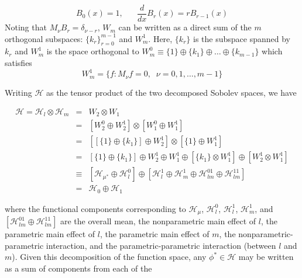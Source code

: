 \documentclass[12pt]{article}
\theoremstyle{definition}
\begin{document}
\[
B_0\left(x\right) = 1,\;\;\;\;\;\; \frac{d}{dx} B_r\left(x\right) = rB_{r-1}\left(x\right)
\]
\noindent
Noting that $M_\nu B_r = \delta_{\nu-r}$, $W_m$ can be written as a direct sum of the $m$ orthogonal subspaces: $\lbrace k_r \rbrace_{r=0}^{m-1}$ and $W_m^1$.   Here, $\lbrace k_r \rbrace$ is the subspace spanned by $k_r$ and $W_m^1$ is the space orthogonal to $W_m^0 \equiv \lbrace 1 \rbrace \oplus \lbrace k_1 \rbrace \oplus \dots \oplus \lbrace k_{m-1} \rbrace$ which satisfies 
\[
W_m^1 = \lbrace f: M_\nu f = 0,\;\; \nu = 0,1,\dots, m-1\rbrace
\]

\noindent
Writing $\mathcal{H}$ as the tensor product of the two decomposed Sobolev spaces, we have

\begin{eqnarray}
\mathcal{H} = \mathcal{H}_l  \otimes \mathcal{H}_m &=& W_2 \otimes W_1 \label{eq:HilbertDecomp} \\ 
&=& \left[ W_2^0 \oplus W_2^1 \right] \otimes \left[ W_1^0 \oplus W_1^1 \right] \nonumber \\ 
&=& \left[ \left[ \lbrace 1 \rbrace \oplus \lbrace k_1 \rbrace \right] \oplus W_2^1 \right] \otimes \left[ \lbrace 1 \rbrace \oplus W_1^1 \right] \nonumber \\ 
&=&\left[ \lbrace 1 \rbrace  \oplus \lbrace k_1 \rbrace \right] \oplus W_2^1 \oplus W_1^1 \oplus  \left[ \lbrace k_1 \rbrace  \otimes  W_1^1 \right]  \oplus  \left[W_2^1 \otimes  W_1^1   \right] \nonumber \\
&\equiv& \left[ \mathcal{H}_{\mu^*} \oplus \mathcal{H}_l^0 \right] \oplus \left[ \mathcal{H}_l^1 \oplus \mathcal{H}_m^1 \oplus \mathcal{H}_{lm}^{01} \oplus \mathcal{H}_{lm}^{11}\right]
\nonumber\\
&=& \mathcal{H}_0 \oplus \mathcal{H}_1
\nonumber
\end{eqnarray} 

\noindent
where the functional components corresponding to $\mathcal{H}_\mu$, $\mathcal{H}_l^0$, $\mathcal{H}_l^1$, $\mathcal{H}_m^1$, and $\left[ \mathcal{H}_{lm}^{01} \oplus \mathcal{H}_{lm}^{11}\right]$ are the overall mean, the nonparametric main effect of $l$, the parametric main effect of $l$, the parametric main effect of $m$, the nonparametric-parametric interaction, and the parametric-parametric interaction (between $l$ and $m$). Given this decomposition of the function space, any $\phi^* \in \mathcal{H}$ may be written as a sum of components from each of the 
\end{document}
